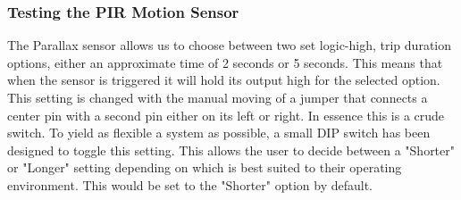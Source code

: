 \subsubsection{Testing the PIR Motion Sensor}
\par The Parallax sensor allows us to choose between two set logic-high, trip duration options, either an approximate time of 2 seconds or 5 seconds. This means that when the sensor is triggered it will hold its output high for the selected option. This setting is changed with the manual moving of a jumper that connects a center pin with a second pin either on its left or right. In essence this is a crude switch. To yield as flexible a system as possible, a small DIP switch has been designed to toggle this setting. This allows the user to decide between a "Shorter" or "Longer" setting depending on which is best suited to their operating environment. This would be set to the "Shorter" option by default. 


 


